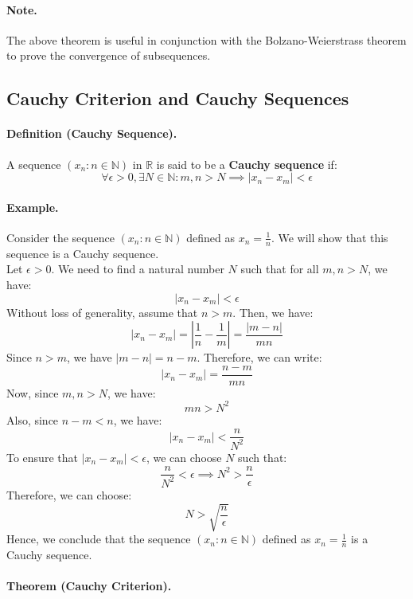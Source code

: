 \documentclass[openany]{book}
\numberwithin{equation}{section}
\begin{document}
\paragraph{Note.}

    The above theorem is useful in conjunction with the Bolzano-Weierstrass theorem to prove the convergence of subsequences.
\par
\subsection{Cauchy Criterion and Cauchy Sequences}
\paragraph{Definition (Cauchy Sequence).}

    A sequence $(x_n : n \in \mathbb{N})$ in $\mathbb{R}$ is said to be a \textbf{Cauchy sequence} if:
    $$\forall \epsilon > 0, \exists N \in \mathbb{N}: m,n > N \implies |x_n - x_m| < \epsilon$$
\par
\paragraph{Example.}

    Consider the sequence $(x_n : n \in \mathbb{N})$ defined as $x_n = \frac{1}{n}$. We will show that this sequence is a Cauchy sequence. \\
    Let $\epsilon > 0$. We need to find a natural number $N$ such that for all $m,n > N$, we have:
    $$|x_n - x_m| < \epsilon$$
    Without loss of generality, assume that $n > m$. Then, we have:
    $$|x_n - x_m| = \left|\frac{1}{n} - \frac{1}{m}\right| = \frac{|m - n|}{mn}$$
    Since $n > m$, we have $|m - n| = n - m$. Therefore, we can write:
    $$|x_n - x_m| = \frac{n - m}{mn}$$
    Now, since $m,n > N$, we have:
    $$mn > N^2$$
    Also, since $n - m < n$, we have:
    $$|x_n - x_m| < \frac{n}{N^2}$$
    To ensure that $|x_n - x_m| < \epsilon$, we can choose $N$ such that:
    $$\frac{n}{N^2} < \epsilon \implies N^2 > \frac{n}{\epsilon}$$
    Therefore, we can choose:
    $$N > \sqrt{\frac{n}{\epsilon}}$$
    Hence, we conclude that the sequence $(x_n : n \in \mathbb{N})$ defined as $x_n = \frac{1}{n}$ is a Cauchy sequence.
\par
\paragraph{Theorem (Cauchy Criterion).}
\end{document}
